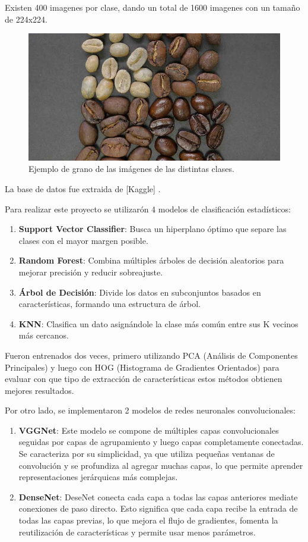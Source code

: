 \documentclass[twocolumn]{article}
\begin{document}
Existen 400 imagenes por clase, dando un total de 1600 imagenes con un tamaño de 224x224.
\begin{figure}[H] 
  \centering
  \includegraphics[width=0.8\columnwidth]{COVER.jpg} 
  \caption{Ejemplo de grano de las imágenes de las distintas clases.}
  \label{fig:verde} 
\end{figure}
La base de datos fue extraida de [Kaggle] \cite{tres}. 

Para realizar este proyecto se utilizarón 4 modelos de clasificación estadísticos: 
\begin{enumerate}[itemsep=0pt, parsep=0pt, leftmargin=*]
  \item \textbf{Support Vector Classifier}: Busca un hiperplano óptimo que separe las clases con el mayor margen posible.
  \item \textbf{Random Forest}: Combina múltiples árboles de decisión aleatorios para mejorar precisión y reducir sobreajuste.
  \item \textbf{Árbol de Decisión}: Divide los datos en subconjuntos basados en características, formando una estructura de árbol.
  \item \textbf{KNN}: Clasifica un dato asignándole la clase más común entre sus K vecinos más cercanos.
\end{enumerate}
 Fueron entrenados dos veces, primero utilizando PCA (Análisis de Componentes Principales) y luego con HOG (Histograma de Gradientes Orientados) para evaluar con que tipo de extracción de características estos métodos obtienen mejores resultados.
 
 Por otro lado, se implementaron 2 modelos de redes neuronales convolucionales:
 \begin{enumerate}[itemsep=0pt, parsep=0pt, leftmargin=*]
  \item \textbf{VGGNet}: Este modelo se compone de múltiples capas convolucionales seguidas por capas de agrupamiento y luego capas completamente conectadas. Se caracteriza por su simplicidad, ya que utiliza pequeñas ventanas de convolución y se profundiza al agregar muchas capas, lo que permite aprender representaciones jerárquicas más complejas.
  \item \textbf{DenseNet}: DeseNet conecta cada capa a todas las capas anteriores mediate conexiones de paso directo. Esto significa que cada capa recibe la entrada de todas las capas previas, lo que mejora el flujo de gradientes, fomenta la reutilización de características y permite usar menos parámetros.
\end{enumerate}
\end{document}
